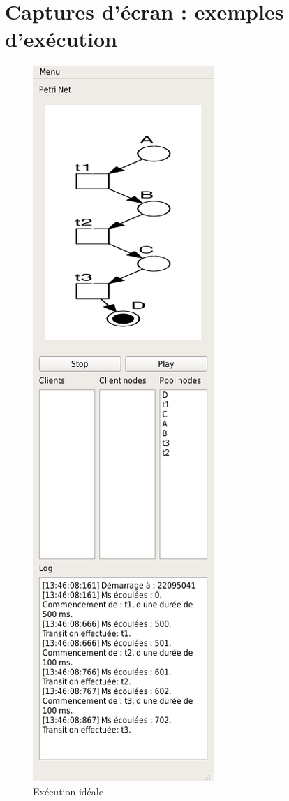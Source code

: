 	\chapter{Captures d'écran : exemples d'exécution}
	\begin{figure}
		\centering
		\includegraphics[scale=0.45]{images/resultats/server_simple_correct.png}
		
		\caption{Exécution idéale}
		\label{fig.executionTheorique}
	\end{figure}
	
